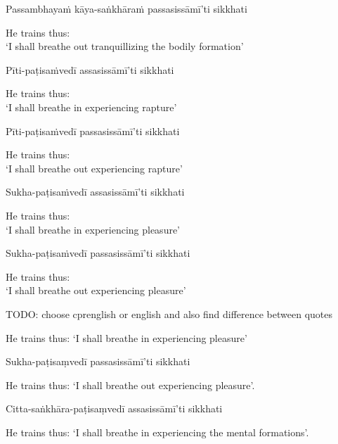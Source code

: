 Passambhayaṁ kāya-saṅkhāraṁ passasissāmī’ti sikkhati

\begin{cprenglish}
He trains thus:\\
‘I shall breathe out tranquillizing the bodily formation’
\end{cprenglish}

Pīti-paṭisaṁvedī assasissāmī’ti sikkhati

\begin{cprenglish}
He trains thus:\\
‘I shall breathe in experiencing rapture’
\end{cprenglish}

Pīti-paṭisaṁvedī passasissāmī’ti sikkhati

\begin{cprenglish}
He trains thus:\\
‘I shall breathe out experiencing rapture’
\end{cprenglish}

Sukha-paṭisaṁvedī assasissāmī’ti sikkhati

\begin{cprenglish}
He trains thus:\\
‘I shall breathe in experiencing pleasure’
\end{cprenglish}

Sukha-paṭisaṁvedī passasissāmī’ti sikkhati

\begin{cprenglish}
He trains thus:\\
‘I shall breathe out experiencing pleasure’
\end{cprenglish}

TODO: choose cprenglish or english and also find difference between quotes

\begin{english}
  He trains thus: `I shall breathe in experiencing pleasure'
\end{english}

Sukha-paṭisaṃvedī passasissāmī'ti sikkhati

\begin{english}
  He trains thus: `I shall breathe out experiencing pleasure'.
\end{english}

Citta-saṅkhāra-paṭisaṃvedī assasissāmī'ti sikkhati

\begin{english}
  He trains thus: `I shall breathe in experiencing the mental formations'.
\end{english}

